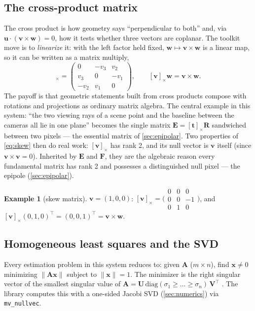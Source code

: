 \documentclass[11pt]{article}
\theoremstyle{definition}
\newtheorem{example}{Example}
\newcommand{\mat}[1]{\mathbf{#1}}
\newcommand{\vect}[1]{\mathbf{#1}}
\newcommand{\R}{\mat{R}}
\newcommand{\F}{\mat{F}}
\newcommand{\E}{\mat{E}}
\newcommand{\tv}{\vect{t}}
\newcommand{\code}[1]{\texttt{#1}}
\begin{document}
\subsection{The cross-product matrix}
The cross product is how geometry says ``perpendicular to both'' and,
via $\vect u\cdot(\vect v\times\vect w)=0$, how it tests whether three
vectors are coplanar. The toolkit move is to \emph{linearize} it: with
the left factor held fixed, $\vect w\mapsto\vect v\times\vect w$ is a
linear map, so it can be written as a matrix multiply,
\begin{equation}
[\vect v]_\times=
\begin{pmatrix}0&-v_3&v_2\\ v_3&0&-v_1\\ -v_2&v_1&0\end{pmatrix},
\qquad [\vect v]_\times\vect w=\vect v\times\vect w .
\label{eq:skew}
\end{equation}
The payoff is that geometric statements built from cross products
compose with rotations and projections as ordinary matrix algebra. The
central example in this system: ``the two viewing rays of a scene point
and the baseline between the cameras all lie in one plane'' becomes the
single matrix $\E=[\tv]_\times\R$ sandwiched between two pixels ---
the essential matrix of \autoref{sec:epipolar}. Two properties of
\eqref{eq:skew} then do real work: $[\vect v]_\times$ has rank 2, and
its null vector is $\vect v$ itself (since $\vect v\times\vect v=0$).
Inherited by $\E$ and $\F$, they are the algebraic reason every
fundamental matrix has rank 2 and possesses a distinguished null pixel
--- the epipole (\autoref{sec:epipolar}).

\begin{example}[skew matrix]
\label{ex:skew}
$\vect v=(1,0,0)$:
$[\vect v]_\times=\bigl(\begin{smallmatrix}0&0&0\\0&0&-1\\0&1&0\end{smallmatrix}\bigr)$,
and $[\vect v]_\times(0,1,0)^{\!\top}=(0,0,1)^{\!\top}=\vect v\times\vect w$. \qedhere
\end{example}

\subsection{Homogeneous least squares and the SVD}
Every estimation problem in this system reduces to: given $\mat A$
($m\times n$), find $\vect x\neq0$ minimizing $\|\mat A\vect x\|$ subject to
$\|\vect x\|=1$. The minimizer is the right singular vector of the smallest
singular value of $\mat A=\mat U\,\mathrm{diag}(\sigma_1\ge\dots\ge\sigma_n)\,\mat V^{\!\top}$
\cite{GolubVanLoan2013}. The library computes this with a one-sided Jacobi
SVD (\autoref{sec:numerics}) via \code{mv\_nullvec}.
\end{document}
